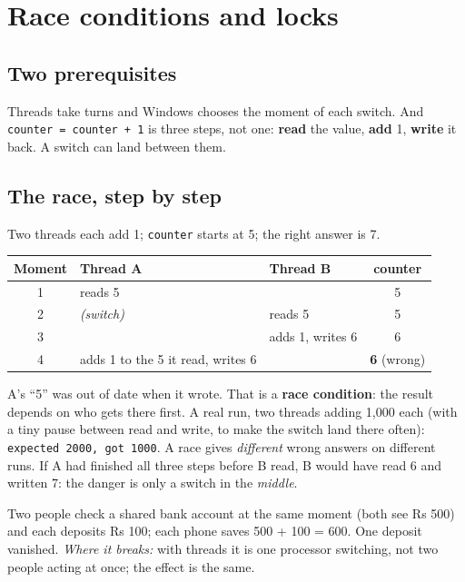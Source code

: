 \documentclass[11pt,a4paper]{article}
\begin{document}
\section{Race conditions and locks}\label{sec:locks}
\subsection{Two prerequisites}
Threads take turns and Windows chooses the moment of each switch. And
\texttt{counter = counter + 1} is three steps, not one: \textbf{read} the value, \textbf{add} 1,
\textbf{write} it back. A switch can land between them.

\subsection{The race, step by step}
Two threads each add 1; \texttt{counter} starts at 5; the right answer is 7.
\begin{center}
\begin{tabularx}{\textwidth}{c X X c}
\toprule
\textbf{Moment} & \textbf{Thread A} & \textbf{Thread B} & \textbf{counter} \\
\midrule
1 & reads 5 & & 5 \\
2 & \emph{(switch)} & reads 5 & 5 \\
3 & & adds 1, writes 6 & 6 \\
4 & adds 1 to the 5 it read, writes 6 & & \textbf{6} (wrong) \\
\bottomrule
\end{tabularx}
\end{center}
\noindent A's ``5'' was out of date when it wrote. That is a \textbf{race condition}: the result
depends on who gets there first. A real run, two threads adding 1{,}000 each (with a tiny pause
between read and write, to make the switch land there often):
\texttt{expected 2000, got 1000}. A race gives \emph{different} wrong answers on different runs.
If A had finished all three steps before B read, B would have read 6 and written 7: the danger is
only a switch in the \emph{middle}.

\begin{analogy}
Two people check a shared bank account at the same moment (both see Rs 500) and each deposits
Rs 100; each phone saves 500 + 100 = 600. One deposit vanished. \emph{Where it breaks:} with
threads it is one processor switching, not two people acting at once; the effect is the same.
\end{analogy}
\end{document}
